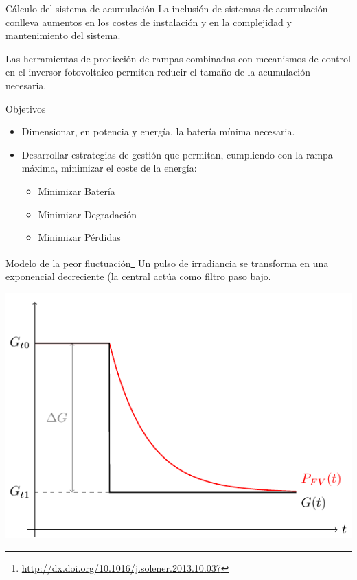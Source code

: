 \documentclass[aspectratio=169, usenames,svgnames,dvipsnames]{beamer}
\begin{document}
\begin{frame}[label={sec:org438188f}]{Cálculo del sistema de acumulación}
La inclusión de sistemas de acumulación conlleva \alert{aumentos en los
costes} de instalación y en la \alert{complejidad y mantenimiento} del
sistema.

Las herramientas de \alert{predicción} de rampas combinadas con \alert{mecanismos de
control en el inversor} fotovoltaico permiten \alert{reducir} el tamaño de la
acumulación necesaria.

\begin{block}{Objetivos}
\begin{itemize}
\item Dimensionar, en \alert{potencia y energía}, la batería mínima necesaria.
\item \alert{Desarrollar estrategias de gestión} que permitan, cumpliendo con la rampa máxima, minimizar el coste de la energía:
\begin{itemize}
\item Minimizar Batería
\item Minimizar Degradación
\item Minimizar Pérdidas
\end{itemize}
\end{itemize}
\end{block}
\end{frame}

\begin{frame}[label={sec:org7adb61a}]{Modelo de la peor fluctuación\footnote{\url{http://dx.doi.org/10.1016/j.solener.2013.10.037}}}
Un pulso de irradiancia se transforma en una exponencial decreciente (la central actúa como filtro paso bajo.

\begin{center}
\includegraphics[height=0.7\textheight]{../figs/ModeloPeorFluctuacion0.pdf}
\end{center}
\end{frame}
\end{document}
